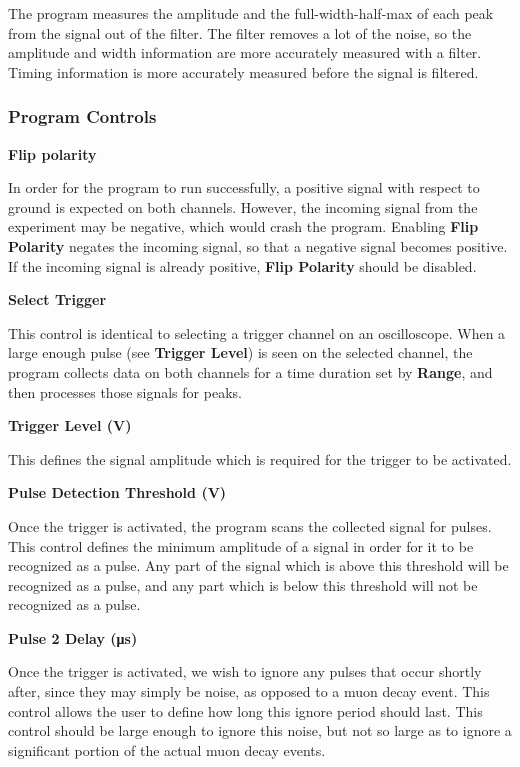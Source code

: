 \documentclass{../lab}
\begin{document}
The program measures the amplitude and the full-width-half-max of each peak from the signal out of the filter. The filter removes a lot of the noise, so the amplitude and width information are more accurately measured with a filter. Timing information is more accurately measured before the signal is filtered.

\subsubsection{Program Controls}

\textbf{Flip polarity}

In order for the program to run successfully, a positive signal with respect to ground is expected on both channels. However, the incoming signal from the experiment may be negative, which would crash the program. Enabling \textbf{Flip Polarity} negates the incoming signal, so that a negative signal becomes positive. If the incoming signal is already positive, \textbf{Flip Polarity} should be disabled.

\textbf{Select Trigger}

This control is identical to selecting a trigger channel on an oscilloscope. When a large enough pulse (see \textbf{Trigger Level}) is seen on the selected channel, the program collects data on both channels for a time duration set by \textbf{Range}, and then processes those signals for peaks.

\textbf{Trigger Level (V)}

This defines the signal amplitude which is required for the trigger to be activated.

\textbf{Pulse Detection Threshold (V)}

Once the trigger is activated, the program scans the collected signal for pulses. This control defines the minimum amplitude of a signal in order for it to be recognized as a pulse. Any part of the signal which is above this threshold will be recognized as a pulse, and any part which is below this threshold will not be recognized as a pulse.

\textbf{Pulse 2 Delay (μs)}

Once the trigger is activated, we wish to ignore any pulses that occur shortly after, since they may simply be noise, as opposed to a muon decay event. This control allows the user to define how long this ignore period should last. This control should be large enough to ignore this noise, but not so large as to ignore a significant portion of the actual muon decay events.
\end{document}
